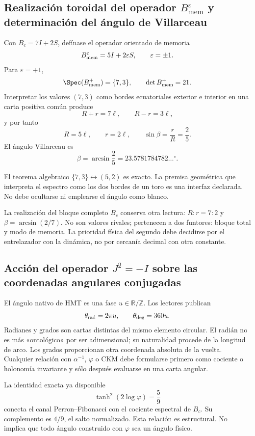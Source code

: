 \subsection{Realización toroidal del operador \texorpdfstring{\(B_{\mathrm{mem}}^{\varepsilon}\)}{Bmem} y determinación del ángulo de Villarceau}

Con \(B_c=7I+2S\), defínase el operador orientado de memoria
\[
B_{\rm mem}^{\varepsilon}=5I+2\varepsilon S,
\qquad\varepsilon=\pm1.
\]
Para \(\varepsilon=+1\),
\[
\Spec(B_{\rm mem}^{+})=\{7,3\},
\qquad\det B_{\rm mem}^{+}=21.
\]
Interpretar los valores \((7,3)\) como bordes ecuatoriales exterior e interior
en una carta positiva común produce
\[
R+r=7\ell,\qquad R-r=3\ell,
\]
y por tanto
\[
R=5\ell,\qquad r=2\ell,\qquad
\sin\beta=\frac rR=\frac25.
\]
El ángulo Villarceau es
\[
\beta=\arcsin\frac25
=23.5781784782\ldots^\circ.
\]

El teorema algebraico \(\{7,3\}\leftrightarrow(5,2)\) es exacto. La premisa
geométrica que interpreta el espectro como los dos bordes de un toro es una
interfaz declarada. No debe ocultarse ni emplearse el ángulo como blanco.

La realización del bloque completo \(B_c\) conserva otra lectura:
\(R:r=7:2\) y \(\beta=\arcsin(2/7)\). No son valores rivales; pertenecen a
dos funtores: bloque total y modo de memoria. La prioridad física del segundo
debe decidirse por el entrelazador con la dinámica, no por cercanía decimal con
otra constante.

\subsection{Acción del operador \texorpdfstring{\(J^2=-I\)}{J2=-I} sobre las coordenadas angulares conjugadas}

El ángulo nativo de HMT es una fase \(u\in\mathbb R/\mathbb Z\). Los lectores
publican
\[
\theta_{\rm rad}=2\pi u,
\qquad
\theta_{\rm deg}=360u.
\]
Radianes y grados son cartas distintas del mismo elemento circular. El radián
no es más «ontológico» por ser adimensional; su naturalidad procede de la
longitud de arco. Los grados proporcionan otra coordenada absoluta de la
vuelta. Cualquier relación con \(\alpha^{-1}\), \(\varphi\) o CKM debe
formularse primero como cociente o holonomía invariante y sólo después
evaluarse en una carta angular.

La identidad exacta ya disponible
\[
\tanh^2(2\log\varphi)=\frac59
\]
conecta el canal Perron--Fibonacci con el cociente espectral de \(B_c\). Su
complemento es \(4/9\), el salto normalizado. Esta relación es estructural.
No implica que todo ángulo construido con \(\varphi\) sea un ángulo físico.

